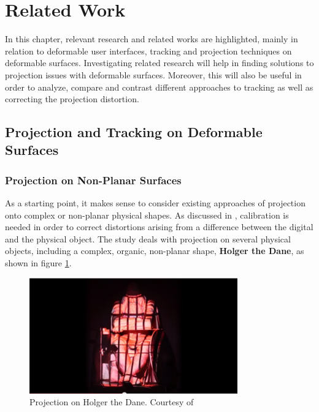 \documentclass[]{article}
\begin{document}
\newpage
\section{Related Work}

In this chapter, relevant research and related works are highlighted, mainly in relation to deformable user interfaces, tracking and projection techniques on deformable surfaces. Investigating related research will help in finding solutions to projection issues with deformable surfaces. Moreover, this will also be useful in order to analyze, compare and contrast different approaches to tracking as well as correcting the projection distortion. 

\subsection{Projection and Tracking on Deformable Surfaces}

\subsubsection{Projection on Non-Planar Surfaces}
As a starting point, it makes sense to consider existing approaches of projection onto complex or non-planar physical shapes. As discussed in \cite{daalsgard11}, calibration is needed in order to correct distortions arising from a difference between the digital and the physical object. The study deals with projection on several physical objects, including a complex, organic, non-planar shape, \textbf{Holger the Dane}, as shown in figure \ref{fig:holger}.

\begin{figure}[hbtp]
    \centering
    \includegraphics[width=0.8\textwidth]{figures/HolgerTheDane.PNG}
    \caption{Projection on Holger the Dane. Courtesy of \cite{daalsgard11}}
    \label{fig:holger}
\end{figure}
\end{document}
